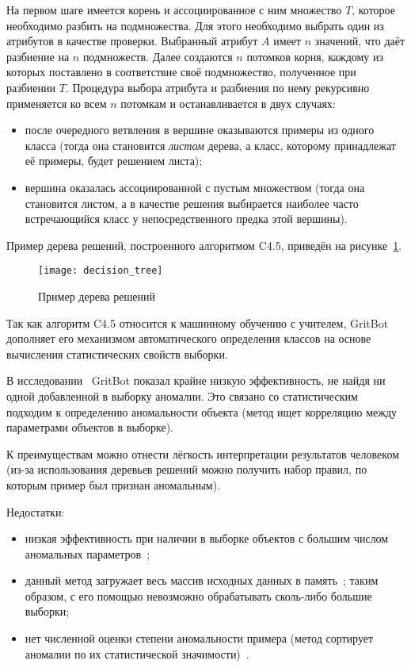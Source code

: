 На первом шаге имеется корень и ассоциированное с ним множество $T$, которое необходимо разбить на подмножества. Для этого необходимо выбрать один из атрибутов в качестве проверки. Выбранный атрибут $A$ имеет $n$ значений, что даёт разбиение на $n$ подмножеств. Далее создаются $n$ потомков корня, каждому из которых поставлено в соответствие своё подмножество, полученное при разбиении $T$. Процедура выбора атрибута и разбиения по нему рекурсивно применяется ко всем $n$ потомкам и останавливается в двух случаях:
\begin{itemize}
	\item после очередного ветвления в вершине оказываются примеры из одного класса (тогда она становится \textit{листом} дерева, а класс, которому принадлежат её примеры, будет решением листа);
	\item вершина оказалась ассоциированной с пустым множеством (тогда она становится листом, а в качестве решения выбирается наиболее часто встречающийся класс у непосредственного предка этой вершины).
\end{itemize}

Пример дерева решений, построенного алгоритмом C4.5, приведён на рисунке~\ref{fig:spec:DecisionTreeExample}.

\begin{figure}[h]
\texttt{[image: decision\_tree]}
\caption{Пример дерева решений} \label{fig:spec:DecisionTreeExample}
\end{figure}

Так как алгоритм C4.5 относится к машинному обучению с учителем, GritBot дополняет его механизмом автоматического определения классов на основе вычисления статистических свойств выборки.

В исследовании~\cite{MLInCyberTrust} GritBot показал крайне низкую эффективность, не найдя ни одной добавленной в выборку аномалии. Это связано со статистическим подходим к определению аномальности объекта (метод ищет корреляцию между параметрами объектов в выборке). 

К преимуществам можно отнести лёгкость интерпретации результатов человеком (из-за использования деревьев решений можно получить набор правил, по которым пример был признан аномальным).

Недостатки:
\begin{itemize}
	\item низкая эффективность при наличии в выборке объектов с большим числом аномальных параметров~\cite{MLInCyberTrust};
	\item данный метод загружает весь массив исходных данных в память~\cite{BaySchwabacherOrca}; таким образом, с его помощью невозможно обрабатывать сколь-либо большие выборки;
	\item нет численной оценки степени аномальности примера (метод сортирует аномалии по их статистической значимости)~\cite{MartinCompUnsupervisedDetectionMethods}.
\end{itemize}